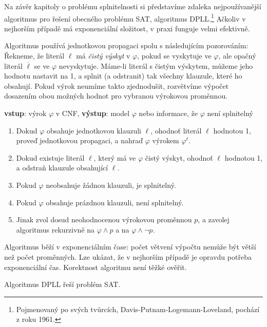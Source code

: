 Na závěr kapitoly o problému splnitelnosti si představíme zdaleka nejpoužívanější algoritmus pro řešení obecného problému SAT, algoritmus DPLL.\footnote{Pojmenovaný po svých tvůrcích, Davis-Putnam-Logemann-Loveland, pochází z roku 1961.} Ačkoliv v nejhorším případě má exponenciální složitost, v praxi funguje velmi efektivně.

Algoritmus používá jednotkovou propagaci spolu s následujícím pozorováním: Řekneme, že literál $\ell$ má \emph{čistý výskyt} v $\varphi$, pokud se vyskytuje ve $\varphi$, ale opačný literál $\overline{\ell}$ se ve $\varphi$ nevyskytuje. Máme-li literál s čistým výskytem, můžeme jeho hodnotu nastavit na 1, a splnit (a odstranit) tak všechny klauzule, které ho obsahují. Pokud výrok neumíme takto zjednodušit, rozvětvíme výpočet dosazením obou možných hodnot pro vybranou výrokovou proměnnou.

\begin{algorithm}[DPLL]
    \textbf{vstup}: výrok $\varphi$ v CNF, \textbf{výstup}: model $\varphi$ nebo informace, že  $\varphi$ není splnitelný
    \begin{enumerate}                
        \item Dokud $\varphi$ obsahuje jednotkovou klauzuli $\ell$, ohodnoť literál $\ell$ hodnotou 1, proveď jednotkovou propagaci, a nahraď $\varphi$ výrokem $\varphi^\ell$.
         \item Dokud existuje literál $\ell$, který má ve $\varphi$ čistý výskyt, ohodnoť $\ell$ hodnotou 1, a odstraň klauzule obsahující $\ell$.
        \item Pokud $\varphi$ neobsahuje žádnou klauzuli, je splnitelný.
        \item Pokud $\varphi$ obsahuje prázdnou klauzuli, není splnitelný.
        \item Jinak zvol dosud neohodnocenou výrokovou proměnnou $p$, a zavolej algoritmus rekurzivně na $\varphi\land p$ a na $\varphi\land \neg p$.
    \end{enumerate}
\end{algorithm}

Algoritmus běží v exponenciálním čase: počet větvení výpočtu nemůže být větší než počet proměnných. Lze ukázat, že v nejhorším případě je opravdu potřeba exponenciální čas. Korektnost algoritmu není těžké ověřit. 

\begin{proposition}
    Algoritmus DPLL řeší problém SAT.
\end{proposition}
    
